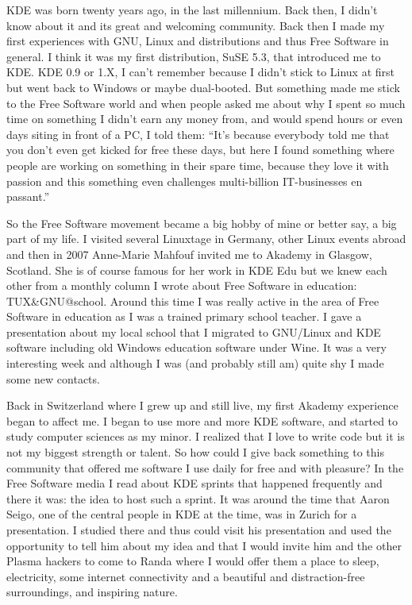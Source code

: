 

\noindent{}KDE was born twenty years ago, in the last millennium. Back then, I didn't know about it and its great and welcoming community. Back then I made my first experiences with GNU, Linux and distributions and thus Free Software in general. I think it was my first distribution, SuSE 5.3, that introduced me to KDE. KDE 0.9 or 1.X, I can't remember because I didn't stick to Linux at first but went back to Windows or maybe dual-booted. But something made me stick to the Free Software world and when people asked me about why I spent so much time on something I didn't earn any money from, and would spend hours or even days siting in front of a PC, I told them: “It's because everybody told me that you don't even get kicked for free these days, but here I found something where people are working on something in their spare time, because they love it with passion and this something even challenges multi-billion IT-businesses en passant.”

So the Free Software movement became a big hobby of mine or better say, a big part of my life. I visited several Linuxtage in Germany, other Linux events abroad and then in 2007 Anne-Marie Mahfouf invited me to Akademy in Glasgow, Scotland. She is of course famous for her work in KDE Edu but we knew each other from a monthly column I wrote about Free Software in education: TUX\&GNU@school. Around this time I was really active in the area of Free Software in education as I was a trained primary school teacher. I gave a presentation about my local school that I migrated to GNU/Linux and KDE software including old Windows education software under Wine. It was a very interesting week and although I was (and probably still am) quite shy I made some new contacts.

Back in Switzerland where I grew up and still live, my first Akademy experience began to affect me. I began to use more and more KDE software, and started to study computer sciences as my minor. I realized that I love to write code but it is not my biggest strength or talent. So how could I give back something to this community that offered me software I use daily for free and with pleasure? In the Free Software media I read about KDE sprints that happened frequently and there it was: the idea to host such a sprint. It was around the time that Aaron Seigo, one of the central people in KDE at the time, was in Zurich for a presentation. I studied there and thus could visit his presentation and used the opportunity to tell him about my idea and that I would invite him and the other Plasma hackers to come to Randa where I would offer them a place to sleep, electricity, some internet connectivity and a beautiful and distraction-free surroundings, and inspiring nature.

